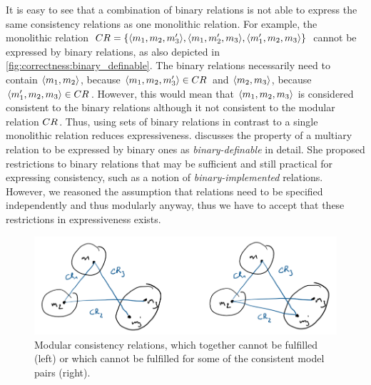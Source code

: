 It is easy to see that a combination of binary relations is not able to express the same consistency relations as one monolithic relation.
For example, the monolithic relation $CR_{} = \{ \langle m_{1}, m_{2}, m_{3}' \rangle, \langle m_{1}, m_{2}', m_{3} \rangle, \langle m_{1}', m_{2}, m_{3} \rangle \}$ cannot be expressed by binary relations, as also depicted in \autoref{fig:correctness:binary_definable}.
The binary relations necessarily need to contain $\langle m_{1}, m_{2} \rangle$, because $\langle m_{1}, m_{2}, m_{3}' \rangle \in CR_{}$ and $\langle m_{2}, m_{3} \rangle$, because $\langle m_{1}', m_{2}, m_{3} \rangle \in CR_{}$. However, this would mean that $\langle m_{1}, m_{2}, m_{3} \rangle$ is considered consistent to the binary relations although it not consistent to the modular relation $CR_{}$.
Thus, using sets of binary relations in contrast to a single monolithic relation reduces expressiveness.
\textcite{stevens2017a} discusses the property of a multiary relation to be expressed by binary ones as \emph{binary-definable} in detail.
She proposed restrictions to binary relations that may be sufficient and still practical for expressing consistency, such as a notion of \emph{binary-implemented} relations.
However, we reasoned the assumption that relations need to be specified independently and thus modularly anyway, thus we have to accept that these restrictions in expressiveness exists.

\begin{figure}
    \centering
    \includegraphics[width=\textwidth]{figures/correctness/notion/contradictions_example.png}
    \caption[Example for incompatible consistency relations]{Modular consistency relations, which together cannot be fulfilled (left) or which cannot be fulfilled for some of the consistent model pairs (right).}
    \label{fig:correctness:contradictions_example}
\end{figure}

